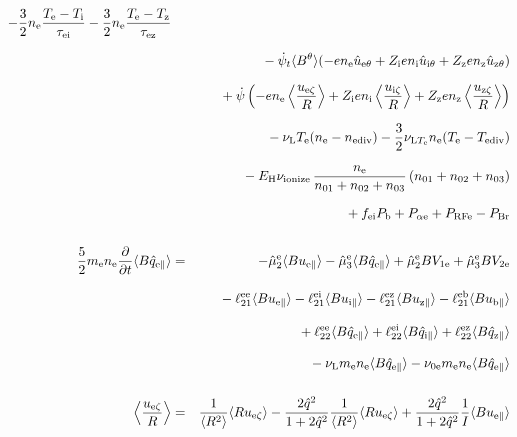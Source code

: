 \documentclass[11pt]{article}
\def\r#1{{\rm#1}}
\def\ave#1{\left\langle#1\right\rangle}
\def\aves#1{\langle#1\rangle}
\def\dd#1#2{\frac{\partial #1}{\partial #2}}
\def\para{\parallel}
\def\ddrho{\frac{\partial}{\partial\rho}}
\def\ddt{\frac{\partial}{\partial t}}
\def\psid{\dot{\psi}}
\def\psit{\psi_t}
\def\psitd{\dot{\psit}}
\def\me{m_\r{e}}
\def\mb{m_\r{b}}
\def\nee{n_\r{e}}
\def\ni{n_\r{i}}
\def\nz{n_\r{z}}
\def\Te{T_\r{e}}
\def\Ti{T_\r{i}}
\def\Tz{T_\r{z}}
\def\Zi{Z_\r{i}}
\def\Zz{Z_\r{z}}
\def\uzt#1{u_{\r{#1}\zeta}}
\def\upara#1{u_{\r{#1}\para}}
\def\uhatth#1{\hat{u}_{\r{#1}\theta}}
\def\qhatpara#1{\hat{q}_{\r{#1}\para}}
\def\nun#1{\nu_\r{0#1}}
\def\ndiv#1{n_\r{#1div}}
\def\Tdiv#1{T_\r{#1div}}
\def\nuLT#1{\nu_{\r{L}T_\r{#1}}}
\def\PRF#1{P_\r{RF#1}}
\def\Palp#1{P_{\alpha\r{#1}}}
\def\fei{f_\r{ei}}
\def\PBr{P_\r{Br}}
\def\Pb{P_\r{b}}
\def\Eb{E_\r{b}}
\def\EH{E_\r{H}}
\def\nna{n_{01}}
\def\nnb{n_{02}}
\def\nnc{n_{03}}
\def\nuL{\nu_\r{L}}
\def\nuion{\nu_\r{ionize}}
\begin{document}
\begin{eqnarray}
%
  - \frac{3}{2} \nee \frac{ \Te - \Ti }{\tau_\r{ei}}
  - \frac{3}{2} \nee \frac{ \Te - \Tz }{\tau_\r{ez}}
\nonumber\\[2.5mm]&&{}
%
%
  - \dot{\psi}_t \aves{B^\theta} (-     e \nee \uhatth{e}
                                  + \Zi e \ni  \uhatth{i}
                                  + \Zz e \nz  \uhatth{z})
\nonumber\\[2.5mm]&&{}
%
%
  +\dot{\psi}\left(-     e \nee \ave{\frac{\uzt{e}}{R}}
	           + \Zi e \ni  \ave{\frac{\uzt{i}}{R}}
	           + \Zz e \nz  \ave{\frac{\uzt{z}}{R}}\right)
\nonumber\\[2.5mm]&&{}
%
  - \nuL \Te (\nee - \ndiv{e})
%
  - \frac{3}{2} \nuLT{e} \nee (\Te - \Tdiv{e})
%
\nonumber\\[2.5mm]&&{}
  - \EH \nuion\, \frac{\nee}{\nna + \nnb + \nnc}\, (\nna + \nnb + \nnc)
\nonumber\\[2.5mm]&&{}
%
  + \fei \Pb
%
%
  + \Palp{e}
%
  + \PRF{e}
%
  - \PBr
\\[5mm]
 \frac{5}{2} \me \nee \ddt \aves{B \qhatpara{e}} &=&
%
  - \hat{\mu}_2^\r{e} \aves{B \upara{e}} 
  - \hat{\mu}_3^\r{e} \aves{B \qhatpara{e}}
%
  + \hat{\mu}_2^\r{e} {B V_{1\r{e}}} 
  + \hat{\mu}_3^\r{e} {B V_{2\r{e}}}
\nonumber\\[3mm]&&{}
%
  - \ell_{21}^{\r{ee}} \aves{B \upara{e}}
  - \ell_{21}^{\r{ei}} \aves{B \upara{i}}
  - \ell_{21}^{\r{ez}} \aves{B \upara{z}}
  - \ell_{21}^{\r{eb}} \aves{B \upara{b}}
\nonumber\\[3mm]&&{}
%
  + \ell_{22}^{\r{ee}} \aves{B \qhatpara{e}}
  + \ell_{22}^{\r{ei}} \aves{B \qhatpara{i}}
  + \ell_{22}^{\r{ez}} \aves{B \qhatpara{z}}
\nonumber\\[3mm]&&{}
%
  - \nuL \me \nee \aves{B \qhatpara{e}}
%
  - \nun{e} \me \nee \aves{B \qhatpara{e}}
\\[5mm]
    \ave{\frac{\uzt{e}}{R}} &=&
%
    \frac{1}{\aves{R^2}} \aves{R\uzt{e}}
%
  - \frac{2\hat{q}^2}{1+2\hat{q}^2} \frac{1}{\aves{R^2}}\aves{R\uzt{e}}
%
  + \frac{2\hat{q}^2}{1+2\hat{q}^2} \frac{1}{I} \aves{B\upara{e}}
\end{eqnarray}
%
\end{document}
